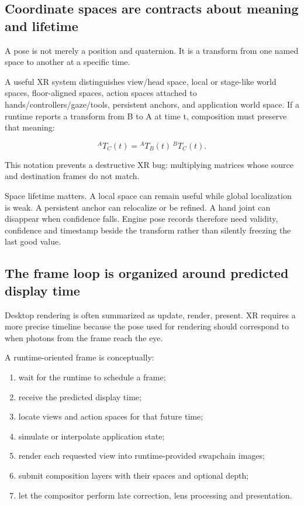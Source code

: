 \subsection{Coordinate spaces are contracts about meaning and lifetime}\label{04-visual-computing-ii-ch035-coordinate-spaces-are-contracts-about-meaning-and-lifetime}

A pose is not merely a position and quaternion. It is a transform from one named space to another at a specific time.

A useful XR system distinguishes view/head space, local or stage-like world spaces, floor-aligned spaces, action spaces attached to hands/controllers/gaze/tools, persistent anchors, and application world space. If a runtime reports a transform from B to A at time t, composition must preserve that meaning:

\[
{}^AT_C(t) = {}^AT_B(t)\,{}^BT_C(t).
\]

This notation prevents a destructive XR bug: multiplying matrices whose source and destination frames do not match.

Space lifetime matters. A local space can remain useful while global localization is weak. A persistent anchor can relocalize or be refined. A hand joint can disappear when confidence falls. Engine pose records therefore need validity, confidence and timestamp beside the transform rather than silently freezing the last good value.

\subsection{The frame loop is organized around predicted display time}\label{04-visual-computing-ii-ch035-the-frame-loop-is-organized-around-predicted-display-time}

Desktop rendering is often summarized as update, render, present. XR requires a more precise timeline because the pose used for rendering should correspond to when photons from the frame reach the eye.

A runtime-oriented frame is conceptually:

\begin{enumerate}
\def\labelenumi{\arabic{enumi}.}
\tightlist
\item
  wait for the runtime to schedule a frame;
\item
  receive the predicted display time;
\item
  locate views and action spaces for that future time;
\item
  simulate or interpolate application state;
\item
  render each requested view into runtime-provided swapchain images;
\item
  submit composition layers with their spaces and optional depth;
\item
  let the compositor perform late correction, lens processing and presentation.
\end{enumerate}


